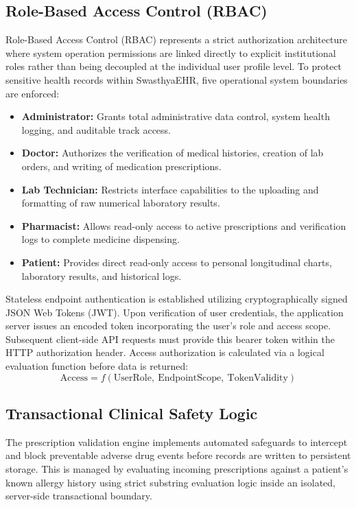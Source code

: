 \documentclass[12pt, a4paper]{report}
\numberwithin{equation}{chapter}
\begin{document}
\subsection{Role-Based Access Control (RBAC)}
Role-Based Access Control (RBAC) represents a strict authorization architecture where system operation permissions are linked directly to explicit institutional roles rather than being decoupled at the individual user profile level. To protect sensitive health records within SwasthyaEHR, five operational system boundaries are enforced:
\begin{itemize}
    \item \textbf{Administrator:} Grants total administrative data control, system health logging, and auditable track access.
    \item \textbf{Doctor:} Authorizes the verification of medical histories, creation of lab orders, and writing of medication prescriptions.
    \item \textbf{Lab Technician:} Restricts interface capabilities to the uploading and formatting of raw numerical laboratory results.
    \item \textbf{Pharmacist:} Allows read-only access to active prescriptions and verification logs to complete medicine dispensing.
    \item \textbf{Patient:} Provides direct read-only access to personal longitudinal charts, laboratory results, and historical logs.
\end{itemize}

Stateless endpoint authentication is established utilizing cryptographically signed JSON Web Tokens (JWT). Upon verification of user credentials, the application server issues an encoded token incorporating the user’s role and access scope. Subsequent client-side API requests must provide this bearer token within the HTTP authorization header. Access authorization is calculated via a logical evaluation function before data is returned:
\begin{equation}
    \text{Access} = f(\text{UserRole},\ \text{EndpointScope},\ \text{TokenValidity})
\end{equation}

\subsection{Transactional Clinical Safety Logic}
The prescription validation engine implements automated safeguards to intercept and block preventable adverse drug events before records are written to persistent storage. This is managed by evaluating incoming prescriptions against a patient's known allergy history using strict substring evaluation logic inside an isolated, server-side transactional boundary. 
\end{document}
